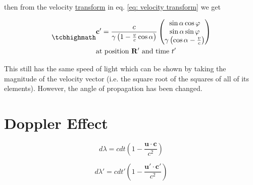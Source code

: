 then from the velocity \hyperlink{def-transform}{transform} in eq. \eqref{eq: velocity transform} we get


\begin{equation}
	\label{eq: velocity transform for light}
	\mhl{
		\begin{aligned}
			 & \mathbf{c}' = \dfrac{c}{\gamma\left(1- \frac{v}{c} \cos\alpha\right) }
			\begin{pmatrix}
				\sin\alpha\cos\varphi                            \\
				\sin\alpha\sin\varphi                            \\
				\gamma \left( \cos\alpha  - \frac{v}{c}  \right) \\
			\end{pmatrix}
			\\
			 & \text{at position $\mathbf{R}'$ and time $t'$ }
		\end{aligned}
	}
\end{equation}

This still has the same speed of light which can be shown by taking the magnitude of the velocity vector (i.e. the square root of the squares of all of its elements). However, the angle of propagation has been changed.

\section{Doppler Effect}

\begin{equation}
	d\lambda = c dt \left( 1 - \dfrac{\mathbf{u}\cdot \mathbf{c}}{c^2} \right)
\end{equation}

\begin{equation}
	d\lambda' = c dt' \left( 1 - \dfrac{\mathbf{u}'\cdot \mathbf{c}'}{c^2} \right)
\end{equation}

